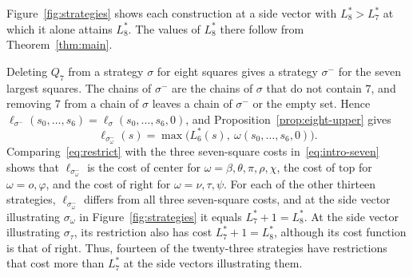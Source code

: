 \documentclass[12pt]{amsart}
\theoremstyle{definition}
\theoremstyle{remark}
\numberwithin{equation}{section}
\numberwithin{figure}{section}
\numberwithin{table}{section}
\newcommand{\omicron}{o}
\newcommand{\st}[1]{\mathrm{#1}}
\begin{document}
Figure~\ref{fig:strategies} shows each construction at a side
vector with $L_8^*>L_7^*$ at which it alone attains $L_8^*$. The values of
$L_8^*$ there follow from Theorem~\ref{thm:main}.

Deleting $Q_7$ from a strategy $\sigma$ for eight squares gives a strategy
$\sigma^-$ for the seven largest squares. The chains of $\sigma^-$ are the
chains of $\sigma$ that do not contain $7$, and removing $7$ from a chain of
$\sigma$ leaves a chain of $\sigma^-$ or the empty set. Hence
$\ell_{\sigma^-}(s_0,\ldots,s_6)=\ell_\sigma(s_0,\ldots,s_6,0)$, and
Proposition~\ref{prop:eight-upper} gives
\begin{equation}\label{eq:restrict}
\ell_{\sigma_\omega^-}(s)=\max\bigl(L_6^*(s),\ \omega(s_0,\ldots,s_6,0)\bigr).
\end{equation}
Comparing~\eqref{eq:restrict} with the three seven-square costs
in~\eqref{eq:intro-seven} shows that $\ell_{\sigma_\omega^-}$ is the cost of
$\st{center}$ for $\omega=\beta,\theta,\pi,\rho,\chi$, the cost of
$\st{top}$ for $\omega=\omicron,\varphi$, and the cost of $\st{right}$ for
$\omega=\nu,\tau,\psi$. For each of the other
thirteen strategies, $\ell_{\sigma_\omega^-}$ differs from all three
seven-square costs, and at the side vector illustrating $\sigma_\omega$ in
Figure~\ref{fig:strategies} it equals $L_7^*+1=L_8^*$. At the side
vector illustrating $\sigma_\tau$, its restriction also has cost
$L_7^*+1=L_8^*$, although its cost function is that of $\st{right}$. Thus,
fourteen of the twenty-three strategies have restrictions that cost more
than $L_7^*$ at the side vectors illustrating them.

\begingroup
\footnotesize
\renewcommand{\arraystretch}{1.0}
\end{document}
